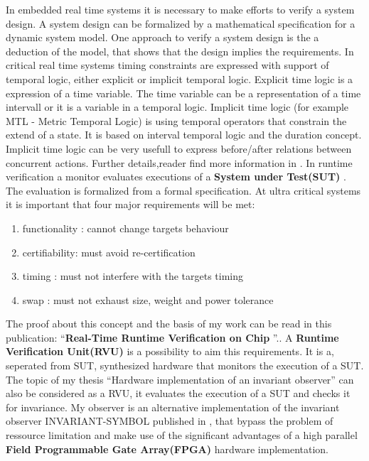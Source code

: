 In embedded real time systems it is necessary to make efforts to verify a system design.
A system design can be formalized by a mathematical specification for a dynamic system model.
One approach to verify a system design is the a deduction of the model, that shows that the design implies 
the requirements. 
In critical real time systems timing constraints are expressed with support of temporal logic, either explicit or implicit
temporal logic. 
Explicit time logic is a expression of a time variable. The time variable can be a representation of a time intervall or
it is a variable in a temporal logic. Implicit time logic (for example MTL - Metric Temporal Logic) 
is using temporal operators that constrain the extend of a state.
It is based on interval temporal logic and the duration concept.
Implicit time logic can be very usefull to express before/after relations
between concurrent actions.
Further details,reader find more information in \cite{210306}.
In runtime verification a monitor evaluates executions of 
a \textbf{System under Test(SUT)} \cite{RTFMBJ13}. 
The evaluation is formalized from a formal specification.
At ultra critical systems it is important that four major requirements will be met:
\begin{enumerate}
 \item functionality : cannot change targets behaviour
 \item certifiability: must avoid re-certification
 \item timing :	  must not interfere with the targets timing
 \item swap :     must not exhaust size, weight and power tolerance
\end{enumerate}
\newpage
The proof about this concept and the basis of my work can be read in this publication: 
``\textbf{Real-Time Runtime Verification on Chip} ''.\cite{RTFMBJ13}.\newline
A \textbf{Runtime Verification Unit(RVU)} is a possibility to aim this requirements.
It is a, seperated from SUT, synthesized hardware that monitors the execution of a SUT.\newline
The topic of my thesis ``Hardware implementation of an invariant observer'' can also be considered as a RVU, 
it evaluates the execution of a SUT and checks it for invariance.
My observer is an alternative  implementation of the invariant observer INVARIANT-SYMBOL published in \cite{RTFMBJ13},
that bypass the problem of ressource limitation and make use of the significant advantages of a high parallel
\textbf{Field Programmable Gate Array(FPGA)} hardware implementation.




